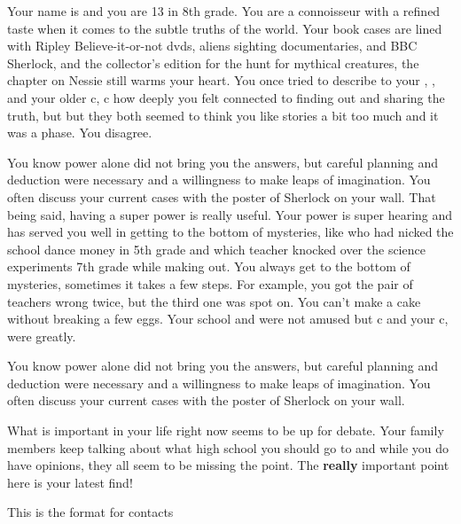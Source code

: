 \documentclass[char]{LRSguildcamp1}
\begin{document}
\name{\cTween{}}





Your name is \cTween{\intro} and you are 13 in 8th grade. You are a connoisseur with a refined taste when it comes to the subtle truths of the world. Your book cases are lined with Ripley Believe-it-or-not dvds, aliens sighting documentaries, and BBC Sherlock, and the collector's edition for the hunt for mythical creatures, the chapter on Nessie still warms your heart. You once tried to describe to your \cArchitect{\parent}, \cArchitect, and your older c\Teen{\sibling}, c\Teen{} how deeply you felt connected to finding out and sharing the truth, but but they both seemed to think you like stories a bit too much and it was a phase. You disagree.


You know power alone did not bring you the answers, but careful planning and deduction were necessary and a willingness to make leaps of imagination. You often discuss your current cases with the poster of Sherlock on your wall. That being said, having a super power is really useful. Your power is super hearing and has served you well in getting to the bottom of mysteries, like who had nicked the school dance money in 5th grade and which teacher knocked over the science experiments 7th grade while making out. You always get to the bottom of mysteries, sometimes it takes a few steps. For example, you got the pair of teachers wrong twice, but the third one was spot on. You can't make a cake without breaking a few eggs. Your school and \cArchitect{\parent} were not amused but c\Grandma{} and your c\Oldest{\uncle}, \cOldest{} were greatly.

You know power alone did not bring you the answers, but careful planning and deduction were necessary and a willingness to make leaps of imagination. You often discuss your current cases with the poster of Sherlock on your wall. 




What is important in your life right now seems to be up for debate. Your family members keep talking about what high school you should go to and while you do have opinions, they all seem to be missing the point. The \textbf{really} important point here is your latest find! 

\begin{itemz}[Goals]
	\item 
\end{itemz}

\begin{itemz}[Notes]
	\item 
\end{itemz}

\begin{contacts}
	\contact{} This is the format for contacts 
\end{contacts}
\end{document}
